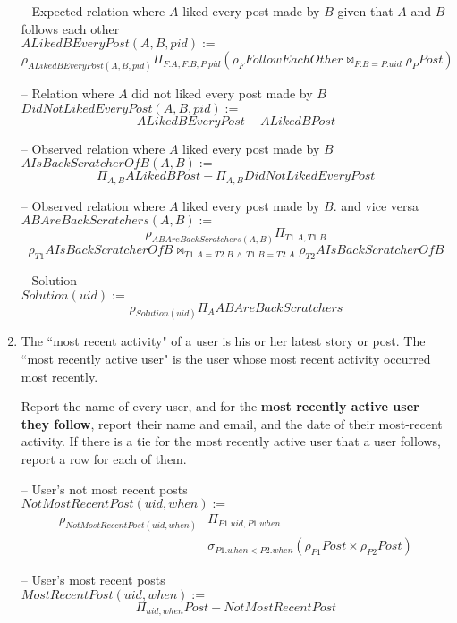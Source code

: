 \documentclass{article}
\newcommand{\var}[1]{\mathit{#1}}
\begin{document}
\begin{enumerate}
{-- Expected relation where $A$ liked every post made by $B$ given that $A$ and $B$ follows each other \\ 
$\var{ALikedBEveryPost}(A,B,pid) :=$ 
\[
    \rho_{ALikedBEveryPost(A,B,pid)}
    \Pi_{F.A, F.B, P.pid} (\rho_{F} \var{FollowEachOther} \bowtie_{F.B=P.uid} \rho_{P} \var{Post})
\]


-- Relation where $A$ did not liked every post made by $B$ \\ 
$\var{DidNotLikedEveryPost}(A,B, pid) :=$
\[
    \var{ALikedBEveryPost} - \var{ALikedBPost}
\]

-- Observed relation where $A$ liked every post made by $B$\\
$\var{AIsBackScratcherOfB}(A,B) :=$
\[
    \Pi_{A,B} \var{ALikedBPost} - \Pi_{A,B} \var{DidNotLikedEveryPost}
\]

-- Observed relation where $A$ liked every post made by $B$. and vice versa\\
$\var{ABAreBackScratchers}(A,B) :=$
\[
    \rho_{\var{ABAreBackScratchers}(A,B)} \Pi_{T1.A, T1.B}
\]
\[
    \rho_{T1} \var{AIsBackScratcherOfB} \bowtie_{T1.A=T2.B \,\land\, T1.B=T2.A} \rho_{T2} \var{AIsBackScratcherOfB}
\]


-- Solution \\
$\var{Solution}(uid) :=$
\[
    \rho_{\var{Solution}(uid)}
    \Pi_{A} \var{ABAreBackScratchers}
\]


}
\item   %
The ``most recent activity" of a user is his or her latest story or post. 
The ``most recently active user" is the user whose most recent activity
occurred most recently.

Report the name of every user, 
and for the \textbf{most recently active user they follow},
report their name and email, and the date of their most-recent activity.
If there is a tie for the most recently active user that a user follows,
report a row for each of them.


{\large  


-- User's not most recent posts \\
$\var{NotMostRecentPost}(uid, when) :=$
\begin{align*}
    \rho_{\var{NotMostRecentPost}(uid, when)}
    &\Pi_{P1.uid, P1.when}\\
    &\sigma_{P1.when < P2.when}
    \left( 
        \rho_{P1} \var{Post} \times \rho_{P2} \var{Post}
    \right)
\end{align*}

-- User's most recent posts \\ 
$\var{MostRecentPost}(uid, when) :=$
\[
    \Pi_{uid, when} \var{Post} - \var{NotMostRecentPost}
\]


}
\end{enumerate}
\end{document}
